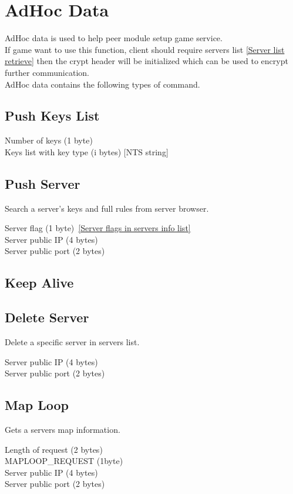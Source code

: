\documentclass[oneside,titlepage,a4paper]{Definition/retrospy} %
\begin{document}
\section{AdHoc Data}\label{section adhoc data}
AdHoc data is used to help peer module setup game service.\\
If game want to use this function, client should require servers list \ref{Server list retrieve}  then the crypt header will be initialized which can be used to encrypt further communication.\\
AdHoc data contains the following types of command.

\subsection{Push Keys List}

\ServerResponse
\begin{mybox}
	Number of keys (1 byte)\\
	Keys list with key type (i bytes) [NTS string]
\end{mybox}

\subsection{Push Server}
Search a server's keys and full rules from server browser.
\ServerResponse
\begin{mybox}
	Server flag (1 byte)~\ref{Server flags in servers info list}\\
	Server public IP (4 bytes)\\
	Server public port (2 bytes)
\end{mybox}
\subsection{Keep Alive}


\subsection{Delete Server}
Delete a specific server in servers list.
\ServerResponse
\begin{mybox}
	Server public IP (4 bytes)\\
	Server public port (2 bytes)
\end{mybox}


\subsection{Map Loop}
Gets a servers map information.
\ClientRequest
\begin{mybox}
	Length of request (2 bytes)\\
	MAPLOOP\_REQUEST (1byte)\\
	Server public IP (4 bytes)\\
	Server public port (2 bytes)
\end{mybox}
\end{document}

